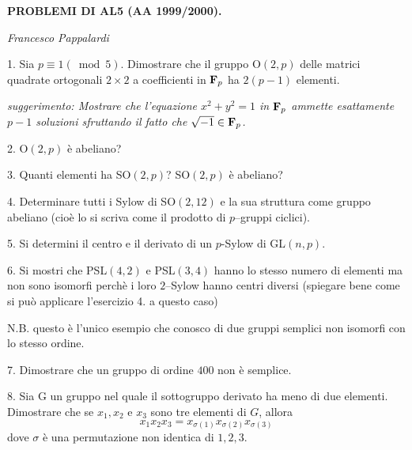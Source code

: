 %
%
%
%
%
\nopagenumbers
\centerline{\bf PROBLEMI DI AL5 (AA 1999/2000).}
\centerline{\it Francesco Pappalardi}
\bigskip\bigskip

\item{1.} Sia $p\equiv1(\bmod5)$. Dimostrare che il gruppo O$(2,p)$ delle matrici quadrate ortogonali
$2\times2$ a coefficienti in ${\bf F}_p$ ha $2(p-1)$ elementi.\par
{\it suggerimento: Mostrare che l'equazione $x^2+y^2=1$ in ${\bf F}_p$ ammette esattamente
$p-1$ soluzioni sfruttando il fatto che $\sqrt{-1}\in{\bf F}_p$.}

\item{2.} O$(2,p)$ \`{e} abeliano?

\item{3.} Quanti elementi ha SO$(2,p)$? SO$(2,p)$ \`{e} abeliano?

\item{4.} Determinare tutti i Sylow di SO$(2,12)$ e la sua struttura come gruppo
abeliano (cio\`{e} lo si scriva come il prodotto di $p$--gruppi ciclici).

\item{5.} Si determini il centro e il derivato di un $p$-Sylow di GL$(n,p)$.

\item{6.} Si mostri che PSL$(4,2)$ e PSL$(3,4)$ hanno lo stesso numero
di elementi ma non sono isomorfi perch\`{e} i loro $2$--Sylow hanno centri 
diversi (spiegare bene come si pu\`{o} applicare l'esercizio 4. a questo
caso) \par 
{\sevenrm N.B. questo \`{e} l'unico esempio che conosco di due gruppi
semplici non isomorfi con lo stesso ordine.}

\item{7.} Dimostrare che un gruppo di ordine $400$ non \`{e} semplice.

\item{8.} Sia G un gruppo nel quale il sottogruppo derivato ha meno di 
due elementi. Dimostrare che se $x_1, x_2$ e $x_3$ sono tre elementi di
$G$, allora 
$$x_1x_2x_3=x_{\sigma(1)}x_{\sigma(2)}x_{\sigma(3)}$$
dove $\sigma$ \`{e} una permutazione non identica di $1, 2, 3$.

